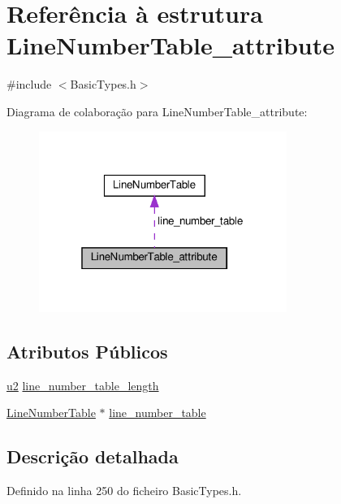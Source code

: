 \hypertarget{structLineNumberTable__attribute}{}\section{Referência à estrutura Line\+Number\+Table\+\_\+attribute}
\label{structLineNumberTable__attribute}


{\ttfamily \#include $<$Basic\+Types.\+h$>$}



Diagrama de colaboração para Line\+Number\+Table\+\_\+attribute\+:
\nopagebreak
\begin{figure}[H]
\begin{center}
\leavevmode
\includegraphics[width=229pt]{structLineNumberTable__attribute__coll__graph}
\end{center}
\end{figure}
\subsection*{Atributos Públicos}
\begin{DoxyCompactItemize}
\item 
\hyperlink{BasicTypes_8h_a732cde1300aafb73b0ea6c2558a7a54f}{u2} \hyperlink{structLineNumberTable__attribute_a758c7ed4a08f1398c0ab0966ea59d7d4}{line\+\_\+number\+\_\+table\+\_\+length}
\item 
\hyperlink{structLineNumberTable}{Line\+Number\+Table} $\ast$ \hyperlink{structLineNumberTable__attribute_a8ec83f7d8f19a6a480733a9c87a6d7f8}{line\+\_\+number\+\_\+table}
\end{DoxyCompactItemize}


\subsection{Descrição detalhada}


Definido na linha 250 do ficheiro Basic\+Types.\+h.




